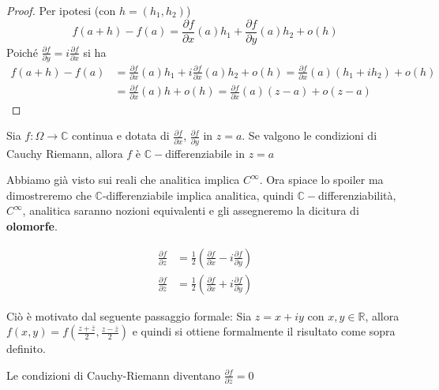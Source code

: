 \begin{proof}
    Per ipotesi (con \(h = (h_{1}, h_{2})\))
    \[
        f(a + h) - f(a) = \frac{\partial f}{\partial x}(a) h_{1} +
        \frac{\partial f}{\partial y}(a) h_{2} + o(h)
    \]
    Poiché \(\frac{\partial f}{\partial y} = i \frac{\partial f}{\partial x}\)
    si ha 
    \begin{align*}
        f(a+h)  - f(a) &= \frac{\partial f}{\partial x}(a) h_{1} +
        i\frac{\partial f}{\partial x}(a) h_{2} + o(h) = \frac{\partial
    f}{\partial x}(a) (h_{1} + ih_{2}) + o(h) \\
        &= \frac{\partial f}{\partial x} (a) h + o(h) = \frac{\partial
        f}{\partial x} (a) (z-a) + o(z-a)
    \end{align*}
\end{proof}
\begin{theorem}
    Sia \(f : \Omega \to \mathbb{C}\) continua e dotata di \(\frac{\partial
    f}{\partial x}\), \(\frac{\partial f}{\partial y}\) in \(z=a\). Se valgono
    le condizioni di Cauchy Riemann, allora \(f\) è
    \(\mathbb{C}-\)differenziabile in \(z=a\) 
\end{theorem}
Abbiamo già visto sui reali che analitica implica \(C^{\infty}\). Ora spiace lo
spoiler ma dimostreremo che \(\mathbb{C}\)-differenziabile implica analitica,
quindi \(\mathbb{C}-\)differenziabilità, \(C^{\infty}\), analitica saranno
nozioni equivalenti e gli assegneremo la dicitura di \textbf{olomorfe}.

\begin{definition}
    \begin{align*}
        \frac{\partial f}{\partial z} &= \frac{1}{2} {\left( \frac{\partial
        f}{\partial x} - i \frac{\partial f}{\partial y} \right)} \\
                    \frac{\partial f}{\partial \overline{z}} &= \frac{1}{2}
                    {\left( \frac{\partial f}{\partial x} + i \frac{\partial
                    f}{\partial y} \right)}
    \end{align*}
\end{definition}
Ciò è motivato dal seguente passaggio formale: Sia \(z = x+iy\) con \(x,y \in
\mathbb{R}\), allora \(f(x,y) = f{\left( \frac{z+\overline{z}}{2},
\frac{z-\overline{z}}{2} \right)} \) e quindi si ottiene formalmente il
risultato come sopra definito.
\begin{remark}
    Le condizioni di Cauchy-Riemann diventano
    \( \displaystyle
        \frac{\partial f}{\partial \overline{z}} = 0
    \)
\end{remark}

